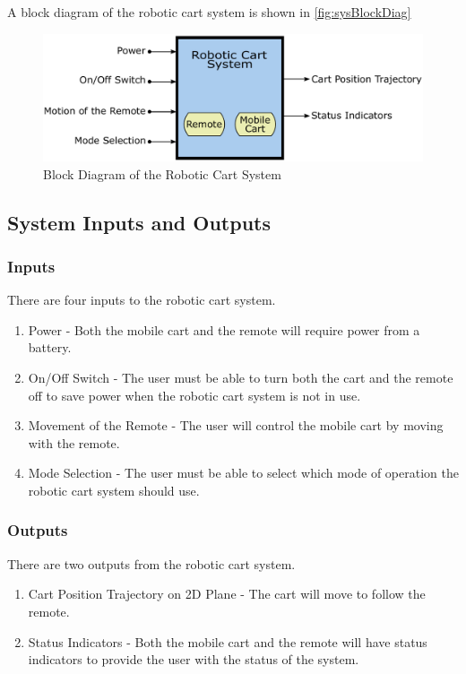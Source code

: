 \documentclass[12pt]{article} %
\begin{document}
A block diagram of the robotic cart system is shown in \autoref{fig:sysBlockDiag}
\begin{figure}[b]
    \centering
    \captionsetup{justification=centering, margin=3cm}
    \includegraphics[width=6.5in]{figs/system_block_diagram}
    \caption{Block Diagram of the Robotic Cart System}
    \label{fig:sysBlockDiag}
\end{figure}

\subsection{System Inputs and Outputs}
\subsubsection{Inputs}
There are four inputs to the robotic cart system.
\begin{enumerate}
    \item Power - Both the mobile cart and the remote will require power from a battery.
    \item On/Off Switch - The user must be able to turn both the cart and the remote off to save power when the robotic cart system is not in use.
    \item Movement of the Remote - The user will control the mobile cart by moving with the remote.
    \item Mode Selection - The user must be able to select which mode of operation the robotic cart system should use.
\end{enumerate}

\subsubsection{Outputs}
There are two outputs from the robotic cart system.
\begin{enumerate}
    \item Cart Position Trajectory on 2D Plane - The cart will move to follow the remote.
    \item Status Indicators - Both the mobile cart and the remote will have status indicators to provide the user with the status of the system.
\end{enumerate}
\end{document}
